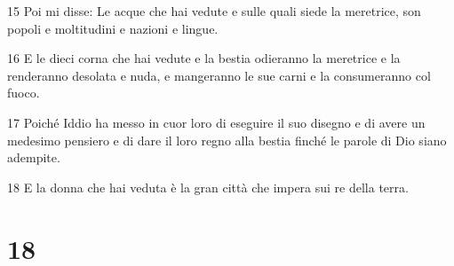 \par 15 Poi mi disse: Le acque che hai vedute e sulle quali siede la meretrice, son popoli e moltitudini e nazioni e lingue.
\par 16 E le dieci corna che hai vedute e la bestia odieranno la meretrice e la renderanno desolata e nuda, e mangeranno le sue carni e la consumeranno col fuoco.
\par 17 Poiché Iddio ha messo in cuor loro di eseguire il suo disegno e di avere un medesimo pensiero e di dare il loro regno alla bestia finché le parole di Dio siano adempite.
\par 18 E la donna che hai veduta è la gran città che impera sui re della terra.

\chapter{18}

